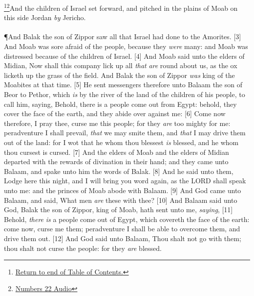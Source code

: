 \footnote{\textcolor[rgb]{0.00,0.25,0.00}{\hyperlink{NumbersTOC}{Return to end of Table of Contents.}}}\footnote{\href{https://audiobible.com/bible/numbers_22.html}{\textcolor[cmyk]{0.99998,1,0,0}{Numbers 22 Audio}}}\textcolor[cmyk]{0.99998,1,0,0}{And the children of Israel set forward, and pitched in the plains of Moab on this side Jordan \emph{by} Jericho.}\\
\\
\P \textcolor[cmyk]{0.99998,1,0,0}{And Balak the son of Zippor saw all that Israel had done to the Amorites.}
[3] \textcolor[cmyk]{0.99998,1,0,0}{And Moab was sore afraid of the people, because they \emph{were} many: and Moab was distressed because of the children of Israel.}
[4] \textcolor[cmyk]{0.99998,1,0,0}{And Moab said unto the elders of Midian, Now shall this company lick up all \emph{that} \emph{are} round about us, as the ox licketh up the grass of the field. And Balak the son of Zippor \emph{was} king of the Moabites at that time.}
[5] \textcolor[cmyk]{0.99998,1,0,0}{He sent messengers therefore unto Balaam the son of Beor to Pethor, which \emph{is} by the river of the land of the children of his people, to call him, saying, Behold, there is a people come out from Egypt: behold, they cover the face of the earth, and they abide over against me:}
[6] \textcolor[cmyk]{0.99998,1,0,0}{Come now therefore, I pray thee, curse me this people; for they \emph{are} too mighty for me: peradventure I shall prevail, \emph{that} we may smite them, and \emph{that} I may drive them out of the land: for I wot that he whom thou blessest \emph{is} blessed, and he whom thou cursest is cursed.}
[7] \textcolor[cmyk]{0.99998,1,0,0}{And the elders of Moab and the elders of Midian departed with the rewards of divination in their hand; and they came unto Balaam, and spake unto him the words of Balak.}
[8] \textcolor[cmyk]{0.99998,1,0,0}{And he said unto them, Lodge here this night, and I will bring you word again, as the LORD shall speak unto me: and the princes of Moab abode with Balaam.}
[9] \textcolor[cmyk]{0.99998,1,0,0}{And God came unto Balaam, and said, What men \emph{are} these with thee?}
[10] \textcolor[cmyk]{0.99998,1,0,0}{And Balaam said unto God, Balak the son of Zippor, king of Moab, hath sent unto me, \emph{saying},}
[11] \textcolor[cmyk]{0.99998,1,0,0}{Behold, \emph{there} \emph{is} a people come out of Egypt, which covereth the face of the earth: come now, curse me them; peradventure I shall be able to overcome them, and drive them out.}
[12] \textcolor[cmyk]{0.99998,1,0,0}{And God said unto Balaam, Thou shalt not go with them; thou shalt not curse the people: for they \emph{are} blessed.}
